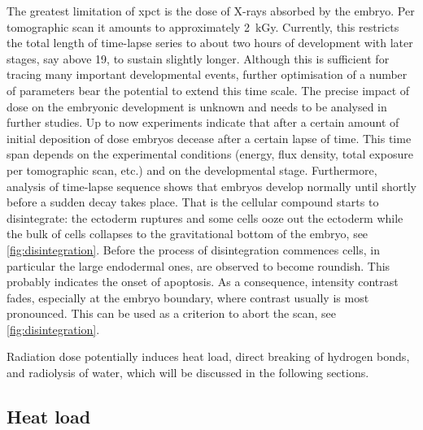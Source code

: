 \documentclass[
twoside,
openright,
titlepage,
numbers=noenddot,
headinclude,
fleqn,
a4paper,
footinclude=true,
cleardoublepage=empty,
abstractoff,
BCOR=5mm,
paper=a4,
fontsize=11pt,
british,ngerman,american,
]{scrreprt}
\begin{document}
The greatest limitation of \ac{xpct} is the dose of X-rays absorbed by
the embryo.  Per tomographic scan it amounts to approximately
\SI{2}{kGy}.  Currently, this restricts the total length of time-lapse
series to about two hours of development with later stages, say above
19, to sustain slightly longer.  Although this is sufficient for
tracing many important developmental events, further optimisation of a
number of parameters bear the potential to extend this time scale.
The precise impact of dose on the embryonic development is unknown and
needs to be analysed in further studies.  Up to now experiments
indicate that after a certain amount of initial deposition of dose
embryos decease after a certain lapse of time.  This time span depends
on the experimental conditions (energy, flux density, total exposure
per tomographic scan, etc.) and on the developmental stage.
Furthermore, analysis of time-lapse sequence shows that embryos
develop normally until shortly before a sudden decay takes place.
That is the cellular compound starts to disintegrate: the ectoderm
ruptures and some cells ooze out the ectoderm while the bulk of cells
collapses to the gravitational bottom of the embryo, see
\cref{fig:disintegration}.  Before the process of disintegration
commences cells, in particular the large endodermal ones, are observed
to become roundish.  This probably indicates the onset of apoptosis.
As a consequence, intensity contrast fades, especially at the embryo
boundary, where contrast usually is most pronounced.  This can be used
as a criterion to abort the scan, see \cref{fig:disintegration}.

Radiation dose potentially induces heat load, direct breaking of
hydrogen bonds, and radiolysis of water, which will be discussed in
the following sections.

\subsection{Heat load}
\label{sec:bio-dose-heat}
\end{document}
